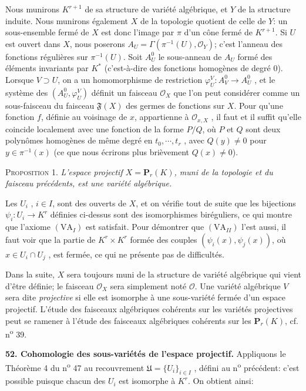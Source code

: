 Nous munirons $K^{r+1}$ de sa structure de variété algébrique, et $Y$ de la structure induite. Nous munirons également $X$ de la topologie quotient de celle de $Y$: un sous-ensemble fermé de $X$ est donc l'image par $\pi$ d'un cône fermé de $K^{r+1}$. Si $U$ est ouvert dans $X$, nous poserons $A_U = \Gamma(\pi^{-1}(U), \mathcal{O}_Y)$; c'est l'anneau des fonctions régulières sur $\pi^{-1}(U)$. Soit $A_U^0$ le sous-anneau de $A_U$ formé des éléments invariants par $K^*$ (c'est-à-dire des fonctions homogènes de degré 0). Lorsque $V \supset U$, on a un homomorphisme de restriction $\varphi_U^V : A_V^0 \to A_U^0$ , et le système des $(A_U^0 , \varphi_U^V)$ définit un faisceau $\mathcal{O}_X$ que l'on peut considérer comme un sous-faisceau du faisceau $\mathfrak{F}(X)$ des germes de fonctions sur $X$. Pour qu'une fonction $f$, définie au voisinage de $x$, appartienne à $\mathcal{O}_{x,X}$ , il faut et il suffit qu'elle coincide localement avec une fonction de la forme $P/Q$, où $P$ et $Q$ sont deux polynômes homogènes
de même degré en $t_0 , \cdots , t_r$ , avec $Q(y) \neq 0$ pour $y \in \pi^{-1}(x)$ (ce que nous écrirons plus brièvement $Q(x) \neq 0$).

\textsc{Proposition} 1. \textit{L'espace projectif $X = \mathbf{P}_r(K)$, muni de la topologie et du faisceau précédents, est une variété algébrique.}

Les $U_i$ , $i \in I$, sont des ouverts de $X$, et on vérifie tout de suite que les bijections $\psi_i : U_i \to K^r$ définies ci-dessus sont des isomorphismes biréguliers, ce qui montre que l'axiome $(\mathrm{VA}_I)$ est satisfait. Pour démontrer que $(\mathrm{VA}_{II})$ l'est aussi, il faut voir que la partie de $K^r \times K^r$ formée des couples $(\psi_i(x), \psi_j(x))$, où $x \in U_i \cap U_j$ , est fermée, ce qui ne présente pas de difficultés.

Dans la suite, $X$ sera toujours muni de la structure de variété algébrique qui vient d'être définie; le faisceau $\mathcal{O}_X$ sera simplement noté $\mathcal{O}$. Une variété algébrique $V$ sera dite \textit{projective} si elle est isomorphe à une sous-variété fermée d'un espace projectif. L'étude des faisceaux algébriques cohérents sur les variétés projectives peut se ramener à l'étude des faisceaux algébriques cohérents sur les $\mathbf{P}_r(K)$, cf. n\textsuperscript{o} 39.

\textbf{52. Cohomologie des sous-variétés de l'espace projectif.} Appliquons le Théorème 4 du n\textsuperscript{o} 47 au recouvrement $\mathfrak{U} = \{U_i\}_{i \in I}$ , défini au n\textsuperscript{o} précédent: c'est possible puisque chacun des $U_i$ est isomorphe à $K^r$. On obtient ainsi:

